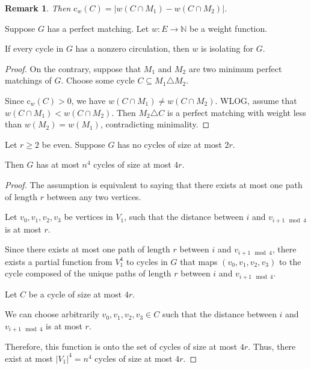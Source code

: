 \documentclass{beamer}
\newtheorem{remark}{Remark}
\newcommand{\nn}{\mathbb{N}}
\newcommand{\cl}{\text{c}}
\begin{document}
\begin{frame}
\begin{remark}
    Then $\cl_w(C) = |w(C \cap M_1) - w(C \cap M_2)|$.
  \end{remark}

  \begin{lemma}
    Suppose $G$ has a perfect matching.
    Let $w : E \to \nn$ be a weight function.

    If every cycle in $G$ has a nonzero circulation, then $w$ is
    isolating for $G$.
  \end{lemma}

  \begin{proof}
    On the contrary, suppose that $M_1$ and $M_2$ are two minimum
    perfect matchings of $G$.
    Choose some cycle $C \subseteq M_1 \triangle M_2$.

    Since $\cl_w(C) > 0$, we have $w(C \cap M_1) \ne w(C \cap M_2)$.
    WLOG, assume that $w(C \cap M_1) < w(C \cap M_2)$.
    Then $M_2 \triangle C$ is a perfect matching with weight less than
    $w(M_2) = w(M_1)$,
    contradicting minimality.
  \end{proof}

  \begin{lemma}
    Let $r \ge 2$ be even.
    Suppose $G$ has no cycles of size at most $2r$.

    Then $G$ has at most $n^4$ cycles of size at most $4r$.
  \end{lemma}

  \begin{proof}
    The assumption is equivalent to saying that there exists at most
    one path of length $r$ between any two vertices.

    Let $v_0, v_1, v_2, v_3$ be vertices in $V_1$, such that the
    distance between $i$ and $v_{i + 1 \mod 4}$ is at most $r$.

    Since there exists at most one path of length $r$ between $i$ and
    $v_{i + 1 \mod 4}$,
    there exists a partial function from $V_1^4$ to cycles in $G$ that maps
    $(v_0, v_1, v_2, v_3)$ to the cycle composed of the unique paths of
    length $r$ between $i$ and $v_{i + 1 \mod 4}$.

    Let $C$ be a cycle of size at most $4r$.

    We can choose arbitrarily $v_0, v_1, v_2, v_3 \in C$ such that
    the distance between $i$ and $v_{i + 1 \mod 4}$ is at most $r$.

    Therefore, this function is onto the set of cycles of size at most $4r$.
    Thus, there exist at most $|V_1|^4 = n^4$ cycles of size at most $4r$.
  \end{proof}


\end{frame}
\end{document}
